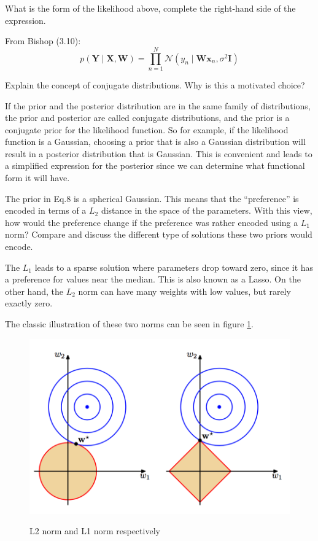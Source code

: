 \documentclass[12pt]{article}
\newenvironment{question}[2][Question]{\begin{trivlist}
\kern10pt
\item[\hskip \labelsep {\bfseries #1}\hskip \labelsep {\bfseries #2.}]}{\end{trivlist}}
\newcommand*{\answer}{%
  \par
  \kern1pt
  \begingroup
    \centering
    \raisebox{.2\baselineskip}{%
      \textcolor{gray}{
	    \rule{.6667\linewidth}{.1pt}%
      }
    }%
    \par
  \kern8pt
  \endgroup
}
\begin{document}
\begin{question}{3}
What is the form of the likelihood above, complete the right-hand side of the expression.
\answer
From Bishop (3.10):
\begin{equation}
p(\boldsymbol{Y} \mid \boldsymbol{X,W}) = \prod_{n=1}^N \mathcal{N}(y_n \mid \boldsymbol{\boldsymbol{Wx}}_n, \sigma^2\boldsymbol{I})
\end{equation}
\end{question}

\begin{question}{4}
Explain the concept of conjugate distributions. Why is this a motivated choice?
\answer
If the prior and the posterior distribution are in the same family of distributions, the prior and posterior are called conjugate distributions, and the prior is a conjugate prior for the likelihood function. So for example, if the likelihood function is a Gaussian, choosing a prior that is also a Gaussian distribution will result in a posterior distribution that is Gaussian. This is convenient and leads to a simplified expression for the posterior since we can determine what functional form it will have.
\end{question}

\begin{question}{5}
The prior in Eq.8 is a spherical Gaussian. This means that the “preference” is encoded in terms of a $L_2$ distance in the space of the parameters. With this view, how would the preference change if the preference was rather encoded using a $L_1$ norm? Compare and discuss
the different type of solutions these two priors would encode.
\answer
The $L_1$ leads to a sparse solution where parameters drop toward zero, since it has a preference for values near the median. This is also known as a Lasso. On the other hand, the $L_2$ norm can have many weights with low values, but rarely exactly zero.

The classic illustration of these two norms can be seen in figure \ref{l1l2norm}.

\begin{figure}
\caption{L2 norm and L1 norm respectively}
\includegraphics[scale=0.8]{l1l2norm}
\centering
\label{l1l2norm}
\end{figure}

\end{question}
\end{document}
